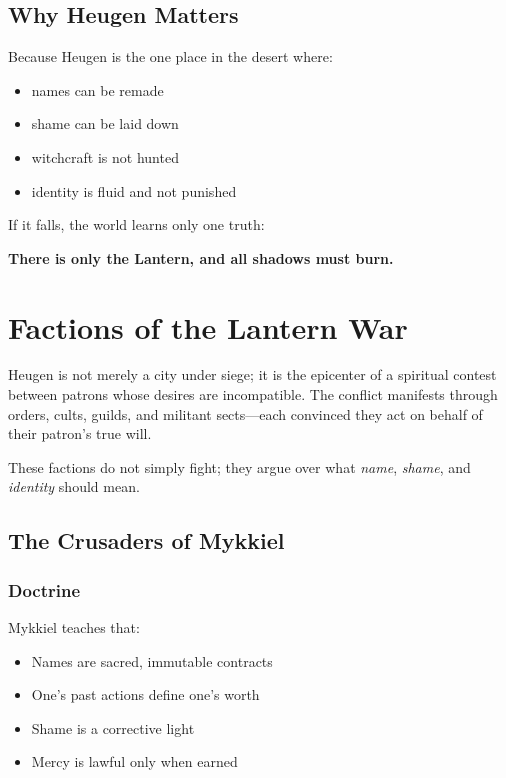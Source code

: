 \documentclass[11pt]{book}
\begin{document}
\subsection{Why Heugen Matters}
Because Heugen is the one place in the desert where:

\begin{itemize}[leftmargin=*]
    \item names can be remade  
    \item shame can be laid down  
    \item witchcraft is not hunted  
    \item identity is fluid and not punished  
\end{itemize}

If it falls, the world learns only one truth:  
\begin{center}
\textbf{There is only the Lantern, and all shadows must burn.}
\end{center}

\section{Factions of the Lantern War}

Heugen is not merely a city under siege; it is the epicenter of a spiritual contest between
patrons whose desires are incompatible. The conflict manifests through orders, cults, guilds,
and militant sects---each convinced they act on behalf of their patron's true will.

These factions do not simply fight; they argue over what \emph{name}, \emph{shame}, and
\emph{identity} should mean.

\subsection{The Crusaders of Mykkiel}

\subsubsection*{Doctrine}
Mykkiel teaches that:
\begin{itemize}[leftmargin=*]
    \item Names are sacred, immutable contracts  
    \item One's past actions define one's worth  
    \item Shame is a corrective light  
    \item Mercy is lawful only when earned  
\end{itemize}
\end{document}
